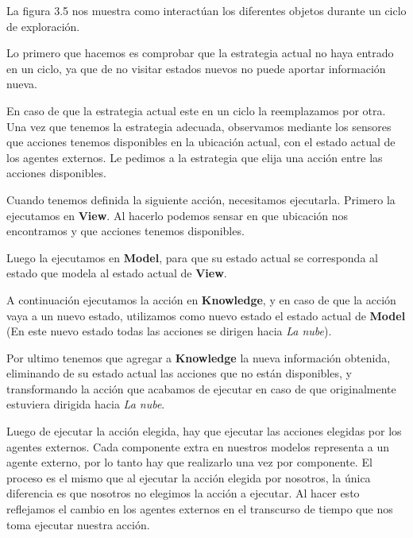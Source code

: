 La figura 3.5 nos muestra como interactúan los diferentes objetos durante un ciclo de exploración.

\vspace{\baselineskip}
Lo primero que hacemos es comprobar que la estrategia actual no haya entrado en un ciclo, ya que de no visitar estados nuevos no puede aportar información nueva.

\vspace{\baselineskip}
En caso de que la estrategia actual este en un ciclo la reemplazamos por otra. Una vez que tenemos la estrategia adecuada, observamos mediante los sensores que
acciones tenemos disponibles en la ubicación actual, con el estado actual de los agentes externos. Le pedimos a la estrategia que elija una acción entre las
acciones disponibles.

\vspace{\baselineskip}
Cuando tenemos definida la siguiente acción, necesitamos ejecutarla. Primero la ejecutamos en \textbf{View}. Al hacerlo podemos sensar en que ubicación nos
encontramos y que acciones tenemos disponibles.

\vspace{\baselineskip}
Luego la ejecutamos en \textbf{Model}, para que su estado actual se corresponda al estado que modela al estado actual de \textbf{View}.

\vspace{\baselineskip}
A continuación ejecutamos la acción en \textbf{Knowledge}, y en caso de que la acción vaya a un nuevo estado, utilizamos como nuevo estado el estado actual
de \textbf{Model} (En este nuevo estado todas las acciones se dirigen hacia \textit{La nube}).

\vspace{\baselineskip}
Por ultimo tenemos que agregar a \textbf{Knowledge} la nueva información obtenida, eliminando de su estado actual las acciones que no están disponibles, y 
transformando la acción que acabamos de ejecutar en caso de que originalmente estuviera dirigida hacia \textit{La nube}.

\vspace{\baselineskip}
Luego de ejecutar la acción elegida, hay que ejecutar las acciones elegidas por los agentes externos. Cada componente extra en nuestros modelos representa a un agente
externo, por lo tanto hay que realizarlo una vez por componente. El proceso es el mismo que al ejecutar la acción elegida por nosotros, la única diferencia es que
nosotros no elegimos la acción a ejecutar. Al hacer esto reflejamos el cambio en los agentes externos en el transcurso de tiempo que nos toma ejecutar nuestra acción.